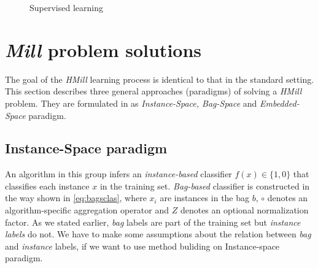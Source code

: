 \begin{figure}
    \centering
    \par
    \caption{Supervised learning}
    \label{fig:mill}
\end{figure}

\section{\emph{Mill} problem solutions}
The goal of the \emph{HMill} learning process is identical to that in the standard setting. This section describes three general approaches (paradigms) of solving a \emph{HMill} problem. They are formulated in \cite{Amores2013} as \emph{Instance-Space, Bag-Space} and \emph{Embedded-Space} paradigm.

\subsection{Instance-Space paradigm}
An algorithm in this group infers an \emph{instance-based} classifier $f(x) \in \{1,0\}$ that classifies each instance $x$ in the training set. \emph{Bag-based} classifier is constructed in the way shown in \ref{eq:bagsclas}, where $x_i$ are instances in the bag $b$, $\circ$ denotes an algorithm-specific aggregation operator and $Z$ denotes an optional normalization factor. As we stated earlier, \emph{bag} labels are part of the training set but \emph{instance labels} do not. We have to make some assumptions about the relation between \emph{bag} and \emph{instance} labels, if we want to use method buliding on Instance-space paradigm.

